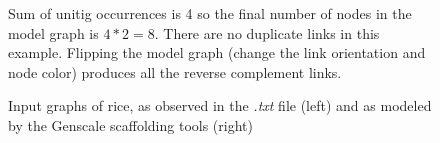 \documentclass[12pt]{article}
\begin{document}
\begin{figure}[h!]
\begin{center}
\end{center}
\caption{Input graphs of rice, as observed in the \textit{.txt} file (left) and as modeled by the Genscale scaffolding tools (right)}
\footnotesize Sum of unitig occurrences is 4 so the final number of nodes in the model graph is $4*2=8$. There are no duplicate links in this example. Flipping the model graph (change the link orientation and node color) produces all the reverse complement links.
\label{fig:riceinpt}
\end{figure}
\newpage
\end{document}
